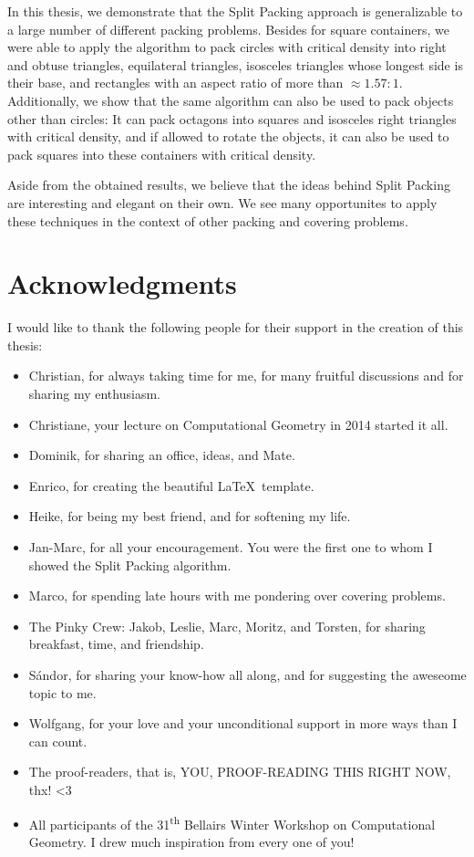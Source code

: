 \documentclass[a4paper,style=print,bibliography=totoc,nexus,lnum,extramargin]{tubsbook}
\begin{document}
In this thesis, we demonstrate that the Split Packing approach is generalizable to a large number of different packing problems.
Besides for square containers, we were able to apply the algorithm to pack circles with critical density into
right and obtuse triangles,
equilateral triangles,
isosceles triangles whose longest side is their base,
and rectangles with an aspect ratio of more than $\approx \! 1.57:1$.
Additionally, we show that the same algorithm can also be used to pack objects other than circles: It can pack octagons into squares and isosceles right triangles with critical density, and if allowed to rotate the objects, it can also be used to pack squares into these containers with critical density.

Aside from the obtained results, we believe that the ideas behind Split Packing are interesting and elegant on their own. We see many opportunites to apply these techniques in the context of other packing and covering problems.

\cleardoublepage

\section*{Acknowledgments}

I would like to thank the following people for their support in the creation of this thesis:

\begin{itemize}
    \item Christian, for always taking time for me, for many fruitful discussions and for sharing my enthusiasm.
    \item Christiane, your lecture on Computational Geometry in 2014 started it all.
    \item Dominik, for sharing an office, ideas, and Mate.
    \item Enrico, for creating the beautiful \LaTeX\ template.
    \item Heike, for being my best friend, and for softening my life.
    \item Jan-Marc, for all your encouragement. You were the first one to whom I showed the Split Packing algorithm.
    \item Marco, for spending late hours with me pondering over covering problems.
    \item The Pinky Crew: Jakob, Leslie, Marc, Moritz, and Torsten, for sharing breakfast, time, and friendship.
    \item Sándor, for sharing your know-how all along, and for suggesting the aweseome topic to me.
    \item Wolfgang, for your love and your unconditional support in more ways than I can count.
    \item The proof-readers, that is, YOU, PROOF-READING THIS RIGHT NOW, thx! <3
    \item All participants of the 31\textsuperscript{th} Bellairs Winter Workshop on Computational Geometry. I drew much inspiration from every one of you!
\end{itemize}
\end{document}
